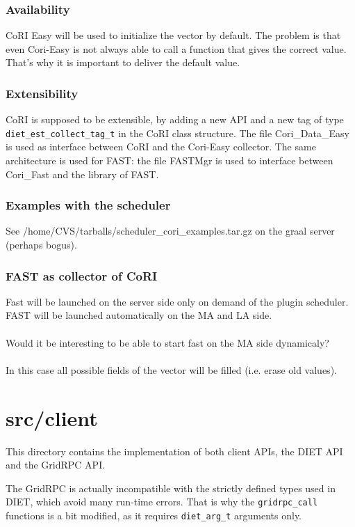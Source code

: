 \subsubsection{Availability}
CoRI Easy will be used to initialize the vector by default. The problem is that even Cori-Easy is not always able to call a function that gives the correct value. That's why it is important to deliver the default value.
  \subsubsection{Extensibility}
  CoRI is supposed to be extensible, by adding a new API and a new tag
  of type \texttt{diet\_est\_collect\_tag\_t} in the
  CoRI class structure.
  The file \textsf{Cori\_Data\_Easy} is used as interface between
  CoRI and the Cori-Easy collector. The same architecture is used for FAST: the file
  \textsf{FASTMgr} is used to interface between Cori\_Fast and the library of
  FAST.
 \subsubsection{Examples  with the scheduler}
 See /home/CVS/tarballs/scheduler\_cori\_examples.tar.gz  on the graal server (perhaps bogus).
 \subsubsection{FAST as collector of CoRI}
 Fast will be launched on the server side only on demand of the plugin scheduler.
 FAST will be launched automatically on the MA and LA side.\\
 \\ Would it be interesting to be able to start fast on the MA side dynamicaly?\\
\\ 
In this case all possible fields of the vector will be filled (i.e. erase old values).

  \section{\textsf{src/client}}
  \label{s:client}

  This directory contains the implementation of both client APIs, the DIET API and
  the GridRPC API.

  The GridRPC is actually incompatible with the strictly defined types used in
  DIET, which avoid many run-time errors. That is why the \texttt{gridrpc\_call}
  functions is a bit modified, as it requires \texttt{diet\_arg\_t} arguments
  only.


